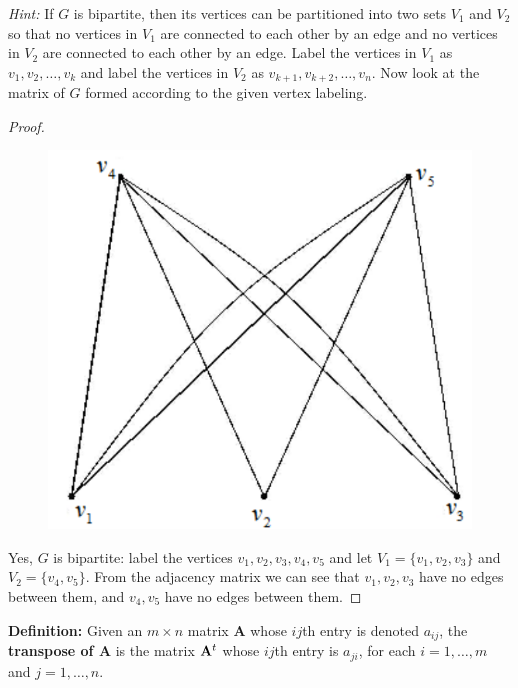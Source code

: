 \documentclass[14pt]{extarticle}
\newcommand{\cy}{\color{cyan}}
\begin{document}
{\it Hint:} If \(G\) is bipartite, then its vertices can be partitioned into two sets \(V_1\) and \(V_2\) so that no
vertices in \(V_1\) are connected to each other by an edge and no vertices in \(V_2\) are connected to each other by an edge.
Label the vertices in \(V_1\) as \(v_1, v_2, \ldots, v_k\) and label the vertices in \(V_2\) as \(v_{k + 1}, v_{k + 2},
\ldots, v_n\). Now look at the matrix of \(G\) formed according to the given vertex labeling.

\begin{proof}
    \begin{figure}[ht!]
        \centering
        \includegraphics[scale=0.2]{../images/10.2.22.a.png}
    \end{figure}

    Yes, \(G\) is bipartite: label the vertices \(v_1, v_2, v_3, v_4, v_5\) and let \(V_1 = \{v_1, v_2, v_3\}\) and \(V_2 =
    \{v_4, v_5\}\). From the adjacency matrix we can see that \(v_1, v_2, v_3\) have no edges between them, and \(v_4, v_5\)
    have no edges between them.
\end{proof}

\begin{tcolorbox}[colframe=cyan]
    {\bf \cy Definition:} Given an \(m \times n\) matrix {\bf A} whose \(ij\)th entry is denoted \(a_{ij}\), the {\bf transpose
            of A} is the matrix \({\bf A}^t\) whose \(ij\)th entry is \(a_{ji}\), for each \(i = 1, \ldots, m\) and \(j = 1, \ldots, n\).
\end{tcolorbox}
\end{document}

